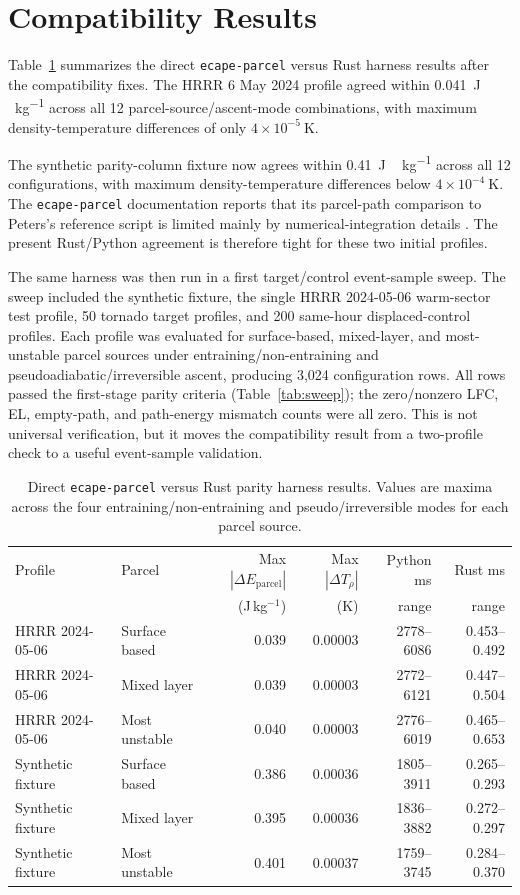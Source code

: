 \documentclass[11pt]{article}
\begin{document}
\section{Compatibility Results}

Table~\ref{tab:parity} summarizes the direct \texttt{ecape-parcel} versus Rust harness results after the compatibility fixes. The HRRR 6 May 2024 profile agreed within \SI{0.041}{J\,kg^{-1}} across all 12 parcel-source/ascent-mode combinations, with maximum density-temperature differences of only $4\times10^{-5}\ \mathrm{K}$.

The synthetic parity-column fixture now agrees within \SI{0.41}{J\,kg^{-1}} across all 12 configurations, with maximum density-temperature differences below $4\times10^{-4}\ \mathrm{K}$. The \texttt{ecape-parcel} documentation reports that its parcel-path comparison to Peters's reference script is limited mainly by numerical-integration details \cite{ecapeparcel}. The present Rust/Python agreement is therefore tight for these two initial profiles.

The same harness was then run in a first target/control event-sample sweep. The sweep included the synthetic fixture, the single HRRR 2024-05-06 warm-sector test profile, 50 tornado target profiles, and 200 same-hour displaced-control profiles. Each profile was evaluated for surface-based, mixed-layer, and most-unstable parcel sources under entraining/non-entraining and pseudoadiabatic/irreversible ascent, producing 3,024 configuration rows. All rows passed the first-stage parity criteria (Table~\ref{tab:sweep}); the zero/nonzero LFC, EL, empty-path, and path-energy mismatch counts were all zero. This is not universal verification, but it moves the compatibility result from a two-profile check to a useful event-sample validation.

\begin{table}[H]
\centering
\caption{Direct \texttt{ecape-parcel} versus Rust parity harness results. Values are maxima across the four entraining/non-entraining and pseudo/irreversible modes for each parcel source.}
\label{tab:parity}
\begin{tabular}{llrrrr}
\toprule
Profile & Parcel & Max $|\Delta E_{\mathrm{parcel}}|$ & Max $|\Delta T_\rho|$ & Python ms & Rust ms \\
 & & (J\,kg$^{-1}$) & (K) & range & range \\
\midrule
HRRR 2024-05-06 & Surface based & 0.039 & 0.00003 & 2778--6086 & 0.453--0.492 \\
HRRR 2024-05-06 & Mixed layer & 0.039 & 0.00003 & 2772--6121 & 0.447--0.504 \\
HRRR 2024-05-06 & Most unstable & 0.040 & 0.00003 & 2776--6019 & 0.465--0.653 \\
Synthetic fixture & Surface based & 0.386 & 0.00036 & 1805--3911 & 0.265--0.293 \\
Synthetic fixture & Mixed layer & 0.395 & 0.00036 & 1836--3882 & 0.272--0.297 \\
Synthetic fixture & Most unstable & 0.401 & 0.00037 & 1759--3745 & 0.284--0.370 \\
\bottomrule
\end{tabular}
\end{table}
\end{document}

